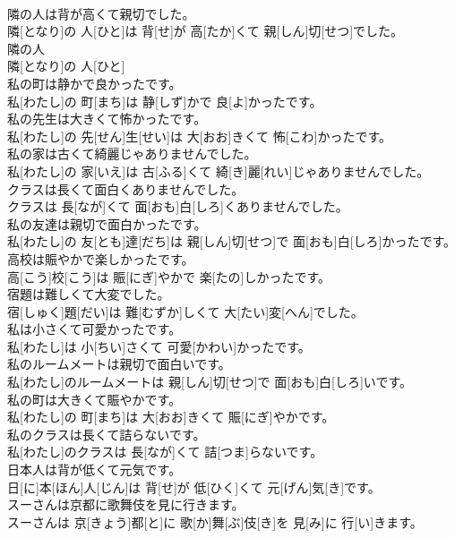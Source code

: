 \documentclass[8pt]{extreport}
\begin{document}
\begin{CJK}{UTF8}{min}
\\	隣の人は背が高くて親切でした。	
\\	隣[となり]の 人[ひと]は 背[せ]が 高[たか]くて 親[しん]切[せつ]でした。
\\	隣の人	
\\	隣[となり]の 人[ひと]	
\\	私の町は静かで良かったです。	
\\	私[わたし]の 町[まち]は 静[しず]かで 良[よ]かったです。
\\	私の先生は大きくて怖かったです。	
\\	私[わたし]の 先[せん]生[せい]は 大[おお]きくて 怖[こわ]かったです。
\\	私の家は古くて綺麗じゃありませんでした。	
\\	私[わたし]の 家[いえ]は 古[ふる]くて 綺[き]麗[れい]じゃありませんでした。
\\	クラスは長くて面白くありませんでした。	
\\	クラスは 長[なが]くて 面[おも]白[しろ]くありませんでした。
\\	私の友達は親切で面白かったです。	
\\	私[わたし]の 友[とも]達[だち]は 親[しん]切[せつ]で 面[おも]白[しろ]かったです。
\\	高校は賑やかで楽しかったです。	
\\	高[こう]校[こう]は 賑[にぎ]やかで 楽[たの]しかったです。
\\	宿題は難しくて大変でした。	
\\	宿[しゅく]題[だい]は 難[むずか]しくて 大[たい]変[へん]でした。
\\	私は小さくて可愛かったです。	
\\	私[わたし]は 小[ちい]さくて 可愛[かわい]かったです。
\\	私のルームメートは親切で面白いです。	
\\	私[わたし]のルームメートは 親[しん]切[せつ]で 面[おも]白[しろ]いです。
\\	私の町は大きくて賑やかです。	
\\	私[わたし]の 町[まち]は 大[おお]きくて 賑[にぎ]やかです。
\\	私のクラスは長くて詰らないです。	
\\	私[わたし]のクラスは 長[なが]くて 詰[つま]らないです。
\\	日本人は背が低くて元気です。	
\\	日[に]本[ほん]人[じん]は 背[せ]が 低[ひく]くて 元[げん]気[き]です。
\\	スーさんは京都に歌舞伎を見に行きます。	
\\	スーさんは 京[きょう]都[と]に 歌[か]舞[ぶ]伎[き]を 見[み]に 行[い]きます。

\end{CJK}
\end{document}
